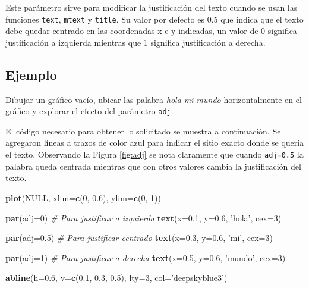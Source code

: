 \documentclass[10pt,]{krantz}
\makeatletter
\newenvironment{Shaded}{\begin{snugshade}}{\end{snugshade}}
\newcommand{\KeywordTok}[1]{\textcolor[rgb]{0.13,0.29,0.53}{\textbf{{#1}}}}
\newcommand{\DataTypeTok}[1]{\textcolor[rgb]{0.13,0.29,0.53}{{#1}}}
\newcommand{\DecValTok}[1]{\textcolor[rgb]{0.00,0.00,0.81}{{#1}}}
\newcommand{\FloatTok}[1]{\textcolor[rgb]{0.00,0.00,0.81}{{#1}}}
\newcommand{\StringTok}[1]{\textcolor[rgb]{0.31,0.60,0.02}{{#1}}}
\newcommand{\CommentTok}[1]{\textcolor[rgb]{0.56,0.35,0.01}{\textit{{#1}}}}
\newcommand{\OtherTok}[1]{\textcolor[rgb]{0.56,0.35,0.01}{{#1}}}
\newcommand{\NormalTok}[1]{{#1}}
\newenvironment{kframe}{%
\medskip{}
\setlength{\fboxsep}{.8em}
 \def\at@end@of@kframe{}%
 \ifinner\ifhmode%
  \def\at@end@of@kframe{\end{minipage}}%
  \begin{minipage}{\columnwidth}%
 \fi\fi%
 \def\FrameCommand##1{\hskip\@totalleftmargin \hskip-\fboxsep
 \colorbox{shadecolor}{##1}\hskip-\fboxsep
     \hskip-\linewidth \hskip-\@totalleftmargin \hskip\columnwidth}%
 \MakeFramed {\advance\hsize-\width
   \@totalleftmargin\z@ \linewidth\hsize
   \@setminipage}}%
 {\par\unskip\endMakeFramed%
 \at@end@of@kframe}
\renewenvironment{Shaded}{\begin{kframe}}{\end{kframe}}
\makeatother
\begin{document}
Este parámetro sirve para modificar la justificación del texto cuando se
usan las funciones \texttt{text}, \texttt{mtext} y \texttt{title}. Su
valor por defecto es 0.5 que indica que el texto debe quedar centrado en
las coordenadas x e y indicadas, un valor de 0 significa justificación a
izquierda mientras que 1 significa justificación a derecha.

\subsection*{Ejemplo}\label{ejemplo-25}


Dibujar un gráfico vacío, ubicar las palabra \emph{hola mi mundo}
horizontalmente en el gráfico y explorar el efecto del parámetro
\texttt{adj}.

El código necesario para obtener lo solicitado se muestra a
continuación. Se agregaron líneas a trazos de color azul para indicar el
sitio exacto donde se quería el texto. Observando la Figura
\ref{fig:adj} se nota claramente que cuando \texttt{adj=0.5} la palabra
queda centrada mientras que con otros valores cambia la justificación
del texto.

\begin{Shaded}
\begin{Highlighting}[]
\KeywordTok{plot}\NormalTok{(}\OtherTok{NULL}\NormalTok{, }\DataTypeTok{xlim=}\KeywordTok{c}\NormalTok{(}\DecValTok{0}\NormalTok{, }\FloatTok{0.6}\NormalTok{), }\DataTypeTok{ylim=}\KeywordTok{c}\NormalTok{(}\DecValTok{0}\NormalTok{, }\DecValTok{1}\NormalTok{))}

\KeywordTok{par}\NormalTok{(}\DataTypeTok{adj=}\DecValTok{0}\NormalTok{)  }\CommentTok{# Para justificar a izquierda}
\KeywordTok{text}\NormalTok{(}\DataTypeTok{x=}\FloatTok{0.1}\NormalTok{, }\DataTypeTok{y=}\FloatTok{0.6}\NormalTok{, }\StringTok{'hola'}\NormalTok{, }\DataTypeTok{cex=}\DecValTok{3}\NormalTok{)}

\KeywordTok{par}\NormalTok{(}\DataTypeTok{adj=}\FloatTok{0.5}\NormalTok{)  }\CommentTok{# Para justificar centrado}
\KeywordTok{text}\NormalTok{(}\DataTypeTok{x=}\FloatTok{0.3}\NormalTok{, }\DataTypeTok{y=}\FloatTok{0.6}\NormalTok{, }\StringTok{'mi'}\NormalTok{, }\DataTypeTok{cex=}\DecValTok{3}\NormalTok{)}

\KeywordTok{par}\NormalTok{(}\DataTypeTok{adj=}\DecValTok{1}\NormalTok{)  }\CommentTok{# Para justificar a derecha}
\KeywordTok{text}\NormalTok{(}\DataTypeTok{x=}\FloatTok{0.5}\NormalTok{, }\DataTypeTok{y=}\FloatTok{0.6}\NormalTok{, }\StringTok{'mundo'}\NormalTok{, }\DataTypeTok{cex=}\DecValTok{3}\NormalTok{)}

\KeywordTok{abline}\NormalTok{(}\DataTypeTok{h=}\FloatTok{0.6}\NormalTok{, }\DataTypeTok{v=}\KeywordTok{c}\NormalTok{(}\FloatTok{0.1}\NormalTok{, }\FloatTok{0.3}\NormalTok{, }\FloatTok{0.5}\NormalTok{),}
       \DataTypeTok{lty=}\DecValTok{3}\NormalTok{, }\DataTypeTok{col=}\StringTok{'deepskyblue3'}\NormalTok{)}
\end{Highlighting}
\end{Shaded}
\end{document}
